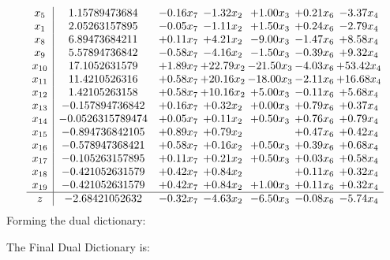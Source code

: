 \documentclass[8pt]{article}
\begin{document}
\[\begin{array}{c| c c@{\hskip 2pt} c@{\hskip 2pt} c@{\hskip 2pt} c@{\hskip 2pt} c@{\hskip 2pt} }
 x_{5}   &  1.15789473684 & -0.16 x_{7} & -1.32 x_{2} & +  1.00 x_{3} & +  0.21 x_{6} & -3.37 x_{4}\\
 x_{1}   &  2.05263157895 & -0.05 x_{7} & -1.11 x_{2} & +  1.50 x_{3} & +  0.24 x_{6} & -2.79 x_{4}\\
 x_{8}   &  6.89473684211 & +  0.11 x_{7} & +  4.21 x_{2} & -9.00 x_{3} & -1.47 x_{6} & +  8.58 x_{4}\\
 x_{9}   &  5.57894736842 & -0.58 x_{7} & -4.16 x_{2} & -1.50 x_{3} & -0.39 x_{6} & +  9.32 x_{4}\\
 x_{10}   &  17.1052631579 & +  1.89 x_{7} & + 22.79 x_{2} & -21.50 x_{3} & -4.03 x_{6} & + 53.42 x_{4}\\
 x_{11}   &  11.4210526316 & +  0.58 x_{7} & + 20.16 x_{2} & -18.00 x_{3} & -2.11 x_{6} & + 16.68 x_{4}\\
 x_{12}   &  1.42105263158 & +  0.58 x_{7} & + 10.16 x_{2} & +  5.00 x_{3} & -0.11 x_{6} & +  5.68 x_{4}\\
 x_{13}   &  -0.157894736842 & +  0.16 x_{7} & +  0.32 x_{2} & +  0.00 x_{3} & +  0.79 x_{6} & +  0.37 x_{4}\\
 x_{14}   &  -0.0526315789474 & +  0.05 x_{7} & +  0.11 x_{2} & +  0.50 x_{3} & +  0.76 x_{6} & +  0.79 x_{4}\\
 x_{15}   &  -0.894736842105 & +  0.89 x_{7} & +  0.79 x_{2} &   & +  0.47 x_{6} & +  0.42 x_{4}\\
 x_{16}   &  -0.578947368421 & +  0.58 x_{7} & +  0.16 x_{2} & +  0.50 x_{3} & +  0.39 x_{6} & +  0.68 x_{4}\\
 x_{17}   &  -0.105263157895 & +  0.11 x_{7} & +  0.21 x_{2} & +  0.50 x_{3} & +  0.03 x_{6} & +  0.58 x_{4}\\
 x_{18}   &  -0.421052631579 & +  0.42 x_{7} & +  0.84 x_{2} &   & +  0.11 x_{6} & +  0.32 x_{4}\\
 x_{19}   &  -0.421052631579 & +  0.42 x_{7} & +  0.84 x_{2} & +  1.00 x_{3} & +  0.11 x_{6} & +  0.32 x_{4}\\
\hline
z    &  -2.68421052632 & -0.32 x_{7} & -4.63 x_{2} & -6.50 x_{3} & -0.08 x_{6} & -5.74 x_{4}\\
\end{array}\]
Forming the dual dictionary:

The Final Dual Dictionary is: 
\end{document}
